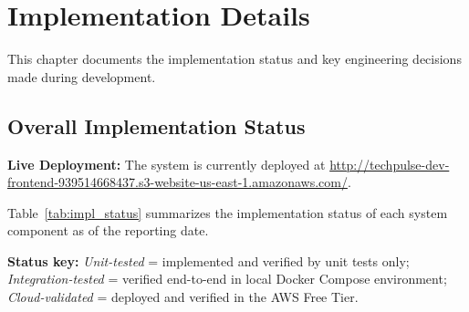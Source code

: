 \chapter{Implementation Details}
\label{ch:progress}

This chapter documents the implementation status and key engineering decisions made during development.

\section{Overall Implementation Status}
\label{sec:impl_status}

\noindent\textbf{Live Deployment:} The system is currently deployed at \url{http://techpulse-dev-frontend-939514668437.s3-website-us-east-1.amazonaws.com/}.

Table~\ref{tab:impl_status} summarizes the implementation status of each system component as of the reporting date.

\noindent\textbf{Status key:} \textit{Unit-tested} = implemented and verified by unit tests only; \textit{Integration-tested} = verified end-to-end in local Docker Compose environment; \textit{Cloud-validated} = deployed and verified in the AWS Free Tier.

